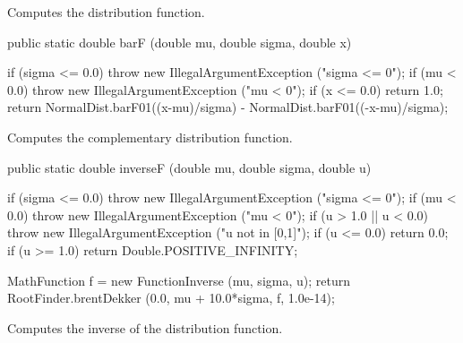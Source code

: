 \begin{tabb}  Computes the distribution function.
\end{tabb}
\begin{htmlonly}
\end{htmlonly}
\begin{code}

   public static double barF (double mu, double sigma, double x)\begin{hide} {
      if (sigma <= 0.0)
         throw new IllegalArgumentException ("sigma <= 0");
      if (mu < 0.0)
         throw new IllegalArgumentException ("mu < 0");
      if (x <= 0.0) return 1.0;
      return NormalDist.barF01((x-mu)/sigma) - NormalDist.barF01((-x-mu)/sigma);
   }\end{hide}
\end{code}
\begin{tabb}  Computes the complementary distribution function.
\end{tabb}
\begin{htmlonly}
\end{htmlonly}
\begin{code}

   public static double inverseF (double mu, double sigma, double u)\begin{hide} {
      if (sigma <= 0.0)
         throw new IllegalArgumentException ("sigma <= 0");
      if (mu < 0.0)
         throw new IllegalArgumentException ("mu < 0");
      if (u > 1.0 || u < 0.0)
         throw new IllegalArgumentException ("u not in [0,1]");
      if (u <= 0.0) return 0.0;
      if (u >= 1.0)
         return Double.POSITIVE_INFINITY;

      MathFunction f = new FunctionInverse (mu, sigma, u);
      return RootFinder.brentDekker (0.0, mu + 10.0*sigma, f, 1.0e-14);
   }\end{hide}
\end{code}
\begin{tabb}  Computes the inverse of the distribution function.
\end{tabb}
\begin{htmlonly}
\end{htmlonly}
